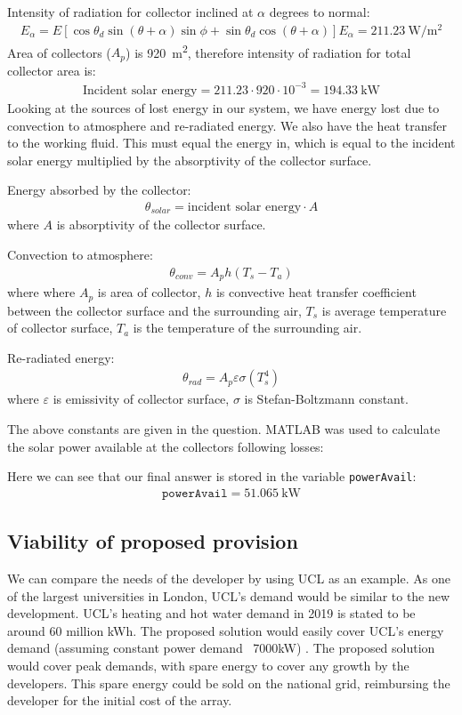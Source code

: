\documentclass[11pt]{article}
\numberwithin{equation}{section}
\begin{document}
Intensity of radiation for collector inclined at $\alpha$ degrees to normal:
\begin{gather}
    E_{\alpha} = E\left[\cos \theta_d \sin\left(\theta + \alpha\right)\sin\phi + \sin\theta_d \cos\left(\theta + \alpha\right)\right]
    E_{\alpha} = \SI{211.23}{\watt\per\square\meter}
\end{gather}
Area of collectors ($A_p$) is \SI{920}{\meter\squared}, therefore intensity of radiation for total collector area is:
\begin{gather}
    \textrm{Incident solar energy} = 211.23\cdot920\cdot10^{-3} = \SI{194.33}{\kilo\watt}
\end{gather}
Looking at the sources of lost energy in our system, we have energy lost due to convection to atmosphere and re-radiated energy. We also have the heat transfer to the working fluid. This must equal the energy in, which is equal to the incident solar energy multiplied by the absorptivity of the collector surface.

Energy absorbed by the collector:
\begin{gather}
    \theta_{solar} = \textrm{incident solar energy} \cdot A
\end{gather}
where $A$ is absorptivity of the collector surface.

Convection to atmosphere:
\begin{gather}
    \theta_{conv} = A_ph\left(T_s - T_a\right)
\end{gather}
where where $A_p$ is area of collector, $h$ is convective heat transfer coefficient between the collector surface and the surrounding air, $T_s$ is average temperature of collector surface, $T_a$ is the temperature of the surrounding air. 

Re-radiated energy:
\begin{gather}
    \theta_{rad} = A_p \varepsilon\sigma\left(T_s^4\right)
\end{gather}
where $\varepsilon$ is emissivity of collector surface, $\sigma$ is Stefan-Boltzmann constant.

The above constants are given in the question. MATLAB was used to calculate the solar power available at the collectors following losses:

Here we can see that our final answer is stored in the variable \texttt{powerAvail}:
\begin{gather}
    \texttt{powerAvail} = \SI{51.065}{\kilo\watt}
\end{gather}
\subsection{Viability of proposed provision}
We can compare the needs of the developer by using UCL as an example. As one of the largest universities in London, UCL's demand would be similar to the new development. UCL's heating and hot water demand in 2019 is stated to be around 60 million kWh. The proposed solution would easily cover UCL's energy demand (assuming constant power demand ~7000kW) \cite{b1}. The proposed solution would cover peak demands, with spare energy to cover any growth by the developers. This spare energy could be sold on the national grid, reimbursing the developer for the initial cost of the array. 
\end{document}
